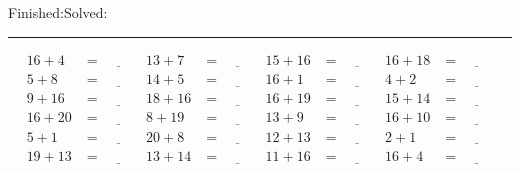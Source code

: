\documentclass{article}
\begin{document}
\begin{sloppy}
\begin{center}
{\selectfont {Started:}\underline{\hspace{1.5cm}}{Finished:}\underline{\hspace{1.5cm}}{Solved:}\underline{\hspace{1.5cm}}}
\end{center}
\hrule
\begin{align*}
    {16} + {4} &= \underline{\hspace{1cm}} & {13} + {7} &= \underline{\hspace{1cm}} & {15} + {16} &= \underline{\hspace{1cm}} & {16} + {18} &= \underline{\hspace{1cm}} \\
    {5} + {8} &= \underline{\hspace{1cm}} & {14} + {5} &= \underline{\hspace{1cm}} & {16} + {1} &= \underline{\hspace{1cm}} & {4} + {2} &= \underline{\hspace{1cm}} \\
    {9} + {16} &= \underline{\hspace{1cm}} & {18} + {16} &= \underline{\hspace{1cm}} & {16} + {19} &= \underline{\hspace{1cm}} & {15} + {14} &= \underline{\hspace{1cm}} \\
    {16} + {20} &= \underline{\hspace{1cm}} & {8} + {19} &= \underline{\hspace{1cm}} & {13} + {9} &= \underline{\hspace{1cm}} & {16} + {10} &= \underline{\hspace{1cm}} \\
    {5} + {1} &= \underline{\hspace{1cm}} & {20} + {8} &= \underline{\hspace{1cm}} & {12} + {13} &= \underline{\hspace{1cm}} & {2} + {1} &= \underline{\hspace{1cm}} \\
    {19} + {13} &= \underline{\hspace{1cm}} & {13} + {14} &= \underline{\hspace{1cm}} & {11} + {16} &= \underline{\hspace{1cm}} & {16} + {4} &= \underline{\hspace{1cm}} \\

\end{align*}
\end{sloppy}
\end{document}
